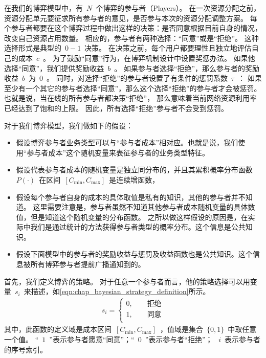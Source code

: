 在我们的博弈模型中，有~$N$~个博弈的参与者（Players）。
在一次资源分配之前，资源分配单元要征求所有参与者的意见，是否参与本次的资源分配调整方案。
每个参与者都要在这个博弈过程中做出这样的决策：是否同意根据目前自身的情况，改变自己资源占用数量。
相应的，参与者有两种选择：“同意”或是“拒绝”。
这种选择形式是典型的~$0-1$~决策。
在决策之前，每个用户都要理性且独立地评估自己的成本~$c$~。
为了鼓励“同意”行为，在博弈机制设计中设置奖惩办法。
如果他选择“同意”，我们提供奖励收益~$b$~。
如果参与者选择“拒绝”，那么参与者的奖励收益~$b$~为~$0$~。
同时，对选择“拒绝”的参与者设置了有条件的惩罚系数~$\tau$~：
如果至少有一个其它的参与者选择“同意”，那么这个选择“拒绝”的参与者才会被惩罚。
也就是说，当在线的所有参与者都决策“拒绝”，
那么意味着当前网络资源利用率已经达到了饱和的上限。
因此，所有选择“拒绝”参与者不会受到惩罚。

对于我们博弈模型，我们做如下的假设：
\begin{itemize}
    \item 假设博弈参与者业务类型可以与“参与者成本”相对应。也就是说，我们使用“参与者成本”这个随机变量来表征参与者的业务类型特征。
    \item 假设代表参与者成本的随机变量是独立同分布的，并且其累积概率分布函数~$P(\cdot)$~在区间~$[C_{\min}, C_{\max}]$~是连续增函数，
    \item 假设每个参与者自身的成本的具体取值是私有的知识，其他的参与者并不知道。
    这里需要注意是，参与者虽然不知道其他参与者成本随机变量的具体数值，但是知道这个随机变量的分布函数。
    之所以做这样假设的原因是，在实际中我们是通过统计的方法获得参与者类型的概率分布。这个信息是公共知识。
    \item 假设下面模型中的参与者的奖励收益与惩罚及收益函数也是公共知识。这个信息被所有博弈参与者提前广播通知到的。
\end{itemize}

首先，我们定义博弈的策略。
对于任意一个参与者而言，他的策略选择可以用变量~$s_i$~来描述，如\eqref{eqn:chap_bayesian_strategy_definition}所示。
\begin{align}
    s_i = \begin{cases}
        0, \qquad\text{拒绝}\\
        1, \qquad\text{同意}\\
    \end{cases}
    \label{eqn:chap_bayesian_strategy_definition}
\end{align}
其中，此函数的定义域是成本区间~$[C_{\min}, C_{\max}]$~，值域是集合~$\{0,1\}$~中取任意一个值。
“~$1$~”表示参与者愿意“同意”；“~$0$~”表示参与者“拒绝”；
~$i$~表示参与者的序号索引。

